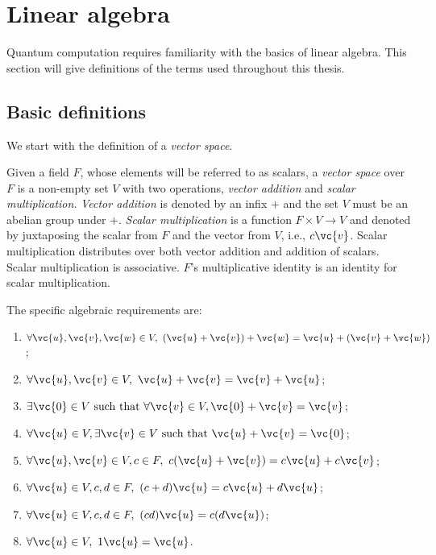 \section{Linear algebra} %
\label{sec:linear_algebra}

Quantum computation requires familiarity with the basics of linear algebra. This section will give
definitions of the terms used throughout this thesis.
\subsection{Basic definitions} %
\label{sub:basic_definitions}


We start with the definition of a \emph{vector space}.

\begin{definition}\label{def:vector_space}
  Given a field $F$, whose elements will be referred to as scalars, a \emph{vector space} over $F$
  is a non-empty set $V$ with two operations, \emph{vector addition} and \emph{scalar
  multiplication}. \emph{Vector addition} is denoted by an infix $+$ and the set $V$ must be an
  abelian group under $+$.
  \emph{Scalar multiplication} is a function $F\times V \to V$ and denoted by juxtaposing the scalar
  from $F$ and the vector from $V$, i.e., $c\vc{v}$. Scalar multiplication distributes over both
  vector  addition and addition of scalars.  Scalar multiplication is associative. $F$'s multiplicative identity is an
  identity for scalar  multiplication.
\end{definition}
The specific algebraic requirements are:
\begin{enumerate}
  \item{}$\forall \vc{u},\vc{v},\vc{w} \in V,\ (\vc{u} +\vc{v}) +\vc{w} =
    \vc{u}+ (\vc{v}+\vc{w})$;
  \item{}$\forall \vc{u},\vc{v} \in V,\ \vc{u} +\vc{v} =
    \vc{v}+ \vc{u}$;
  \item{}$\exists  \vc{0} \in V \mathrm{\ such\ that\ } \forall \vc{v} \in V,
    \vc{0} +\vc{v} =  \vc{v}$;
  \item{}$\forall \vc{u} \in V, \exists \vc{v} \in V \mathrm{\ such\ that\ }
    \vc{u}+ \vc{v} = \vc{0}$;
  \item{}$\forall \vc{u},\vc{v} \in V, c\in F,\
    c(\vc{u}+ \vc{v}) = c\vc{u} + c\vc{v}$;
  \item{}$\forall \vc{u} \in V, c,d\in F,\
    (c+d)\vc{u} = c\vc{u} + d\vc{u}$;
  \item{}$\forall \vc{u} \in V, c,d\in F,\
    (c d)\vc{u} = c(d\vc{u})$;
  \item{}$\forall \vc{u} \in V,\
    1\vc{u} = \vc{u}$.
\end{enumerate}

